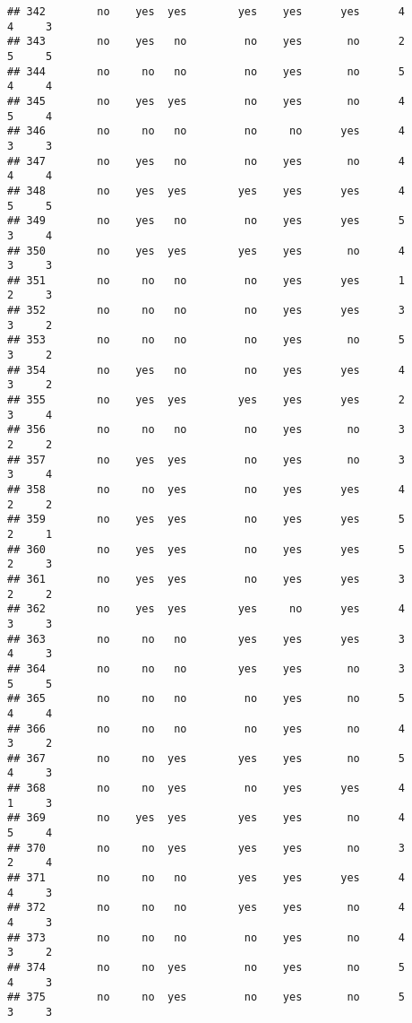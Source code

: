 \documentclass[]{article}
\begin{document}
\begin{verbatim}
## 342        no    yes  yes        yes    yes      yes      4        4     3
## 343        no    yes   no         no    yes       no      2        5     5
## 344        no     no   no         no    yes       no      5        4     4
## 345        no    yes  yes         no    yes       no      4        5     4
## 346        no     no   no         no     no      yes      4        3     3
## 347        no    yes   no         no    yes       no      4        4     4
## 348        no    yes  yes        yes    yes      yes      4        5     5
## 349        no    yes   no         no    yes      yes      5        3     4
## 350        no    yes  yes        yes    yes       no      4        3     3
## 351        no     no   no         no    yes      yes      1        2     3
## 352        no     no   no         no    yes      yes      3        3     2
## 353        no     no   no         no    yes       no      5        3     2
## 354        no    yes   no         no    yes      yes      4        3     2
## 355        no    yes  yes        yes    yes      yes      2        3     4
## 356        no     no   no         no    yes       no      3        2     2
## 357        no    yes  yes         no    yes       no      3        3     4
## 358        no     no  yes         no    yes      yes      4        2     2
## 359        no    yes  yes         no    yes      yes      5        2     1
## 360        no    yes  yes         no    yes      yes      5        2     3
## 361        no    yes  yes         no    yes      yes      3        2     2
## 362        no    yes  yes        yes     no      yes      4        3     3
## 363        no     no   no        yes    yes      yes      3        4     3
## 364        no     no   no        yes    yes       no      3        5     5
## 365        no     no   no         no    yes       no      5        4     4
## 366        no     no   no         no    yes       no      4        3     2
## 367        no     no  yes        yes    yes       no      5        4     3
## 368        no     no  yes         no    yes      yes      4        1     3
## 369        no    yes  yes        yes    yes       no      4        5     4
## 370        no     no  yes        yes    yes       no      3        2     4
## 371        no     no   no        yes    yes      yes      4        4     3
## 372        no     no   no        yes    yes       no      4        4     3
## 373        no     no   no         no    yes       no      4        3     2
## 374        no     no  yes         no    yes       no      5        4     3
## 375        no     no  yes         no    yes       no      5        3     3

\end{verbatim}
\end{document}
